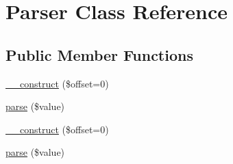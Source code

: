 \hypertarget{class_symfony_1_1_components_1_1_yaml_1_1_parser}{
\section{Parser Class Reference}
\label{class_symfony_1_1_components_1_1_yaml_1_1_parser}
}
\subsection*{Public Member Functions}
\begin{DoxyCompactItemize}
\item 
\hyperlink{class_symfony_1_1_components_1_1_yaml_1_1_parser_aa9388d8255ba88ef404307c6aee9fb37}{\_\-\_\-construct} (\$offset=0)
\item 
\hyperlink{class_symfony_1_1_components_1_1_yaml_1_1_parser_ae646f55333c0c77dc5b912df945862c5}{parse} (\$value)
\item 
\hyperlink{class_symfony_1_1_components_1_1_yaml_1_1_parser_aa9388d8255ba88ef404307c6aee9fb37}{\_\-\_\-construct} (\$offset=0)
\item 
\hyperlink{class_symfony_1_1_components_1_1_yaml_1_1_parser_ae646f55333c0c77dc5b912df945862c5}{parse} (\$value)
\end{DoxyCompactItemize}
